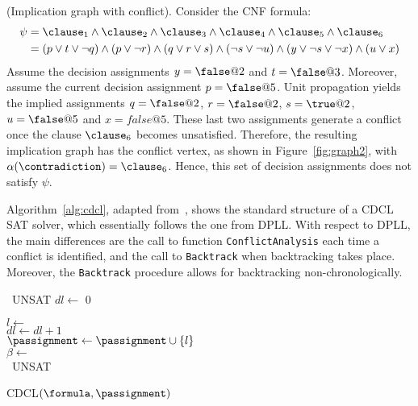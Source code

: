 \begin{example}%
    \label{ex:graph2}
    (Implication graph with conflict). Consider the CNF formula:
    \begin{align*}
        \psi & = \clause_1 \land \clause_2 \land \clause_3 \land \clause_4 \land \clause_5 \land \clause_6  \\
                 & = (p \lor t \lor \neg q) \land (p \lor \neg r) \land (q \lor r \lor s) \land (\neg s \lor \neg u) \land (y \lor \neg s \lor \neg x) \land (u \lor x)
    \end{align*}
    Assume the decision assignments $y = \false @2$ and $t = \false @3$.
    Moreover, assume the current decision assignment $p = \false @5$.  Unit
    propagation yields the implied assignments $q = \false @2$, $r = \false @2$,
    $s = \true @2$, $u = \false @5$ and $x = false @5$. These last two
    assignments generate a conflict once the clause $\clause_6$ becomes
    unsatisfied. Therefore, the resulting implication graph has the conflict
    vertex, as shown in Figure~\ref{fig:graph2}, with $\alpha(\contradiction) =
    \clause_6$.  Hence, this set of decision assignments does not satisfy
    $\psi$.
    
\end{example}

Algorithm~\ref{alg:cdcl}, adapted from~\cite{cdclchapter}, shows the standard
structure of a CDCL SAT solver, which essentially follows the one from DPLL\@.
With respect to DPLL, the main differences are the call to function
\texttt{ConflictAnalysis} each time a conflict is identified, and the call to
\texttt{Backtrack} when backtracking takes place. Moreover, the
\texttt{Backtrack} procedure allows for backtracking non-chronologically. 

\begin{algorithm}[!ht]
    {\Return~UNSAT}
    $dl \leftarrow$ 0

    \While{$\neg$\alvarass{$\formula$, $\passignment$}}
    {%
        $l \leftarrow$ \pickvar{$\formula$, $\passignment$}\\
        $dl \leftarrow dl + 1$\\
        $\passignment \leftarrow \passignment \cup \{l\}$\\
        {%
            $\beta \leftarrow$ \\
            {\Return~UNSAT}
        }
    }
    \caption{CDCL$(\formula, \passignment)$}%
\label{alg:cdcl}
\end{algorithm}

